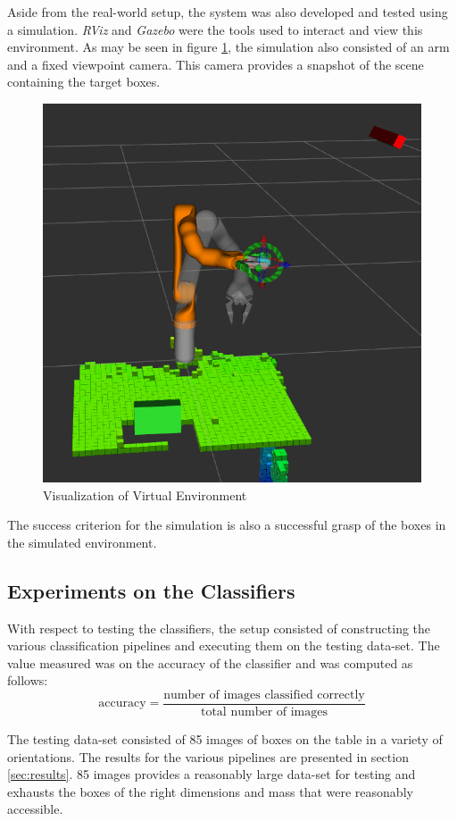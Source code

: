 \documentclass[letterpaper, 10 pt, conference]{conf/ieeeconf}  %
\begin{document}
Aside from the real-world setup, the system was also developed and tested using
a simulation. \textit{RViz} and \textit{Gazebo} were the tools used to interact
and view this environment. As may be seen in figure
\ref{fig:virtual_environment}, the simulation also consisted of an arm and a
fixed viewpoint camera. This camera provides a snapshot of the scene containing
the target boxes.

\begin{figure}[ht]
  \centering
  \includegraphics[width=0.8\linewidth]{virtual_environment.png}
  \caption{\label{fig:virtual_environment} Visualization of Virtual Environment}
\end{figure}

The success criterion for the simulation is also a successful grasp of the boxes
in the simulated environment.

\subsection{Experiments on the Classifiers}
With respect to testing the classifiers, the setup consisted of constructing the
various classification pipelines and executing them on the testing data-set. The
value measured was on the accuracy of the classifier and was computed as
follows:
\begin{equation*}
  \text{accuracy} = \dfrac{\text{number of images classified correctly}}{\text{total number of images}}
\end{equation*}

The testing data-set consisted of 85 images of boxes on the table in a variety
of orientations. The results for the various pipelines are presented in section
\ref{sec:results}. 85 images provides a reasonably large data-set for testing
and exhausts the boxes of the right dimensions and mass that were reasonably
accessible.
\end{document}
